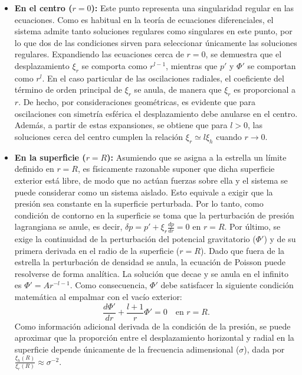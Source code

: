 \begin{itemize}
\item \textbf{En el centro ($r=0$):} Este punto representa una singularidad regular en las ecuaciones. Como es habitual en la teoría de ecuaciones diferenciales, el sistema admite tanto soluciones regulares como singulares en este punto, por lo que dos de las condiciones sirven para seleccionar únicamente las soluciones regulares. Expandiendo las ecuaciones cerca de $r=0$, se demuestra que el desplazamiento $\xi_r$ se comporta como $r^{l-1}$, mientras que $p'$ y $\Phi'$ se comportan como $r^l$. En el caso particular de las oscilaciones radiales, el coeficiente del término de orden principal de $\xi_r$ se anula, de manera que $\xi_r$ es proporcional a $r$. De hecho, por consideraciones geométricas, es evidente que para oscilaciones con simetría esférica el desplazamiento debe anularse en el centro. Además, a partir de estas expansiones, se obtiene que para $l>0$, las soluciones cerca del centro cumplen la relación $\xi_r \simeq l\xi_h$ cuando $r \rightarrow 0$.

\item \textbf{En la superficie ($r=R$):} Asumiendo que se asigna a la estrella un límite definido en $r=R$, es físicamente razonable suponer que dicha superficie exterior está libre, de modo que no actúan fuerzas sobre ella y el sistema se puede considerar como un sistema aislado. Esto equivale a exigir que la presión sea constante en la superficie perturbada. Por lo tanto, como condición de contorno en la superficie se toma que la perturbación de presión lagrangiana se anule, es decir, $\delta p = p' + \xi_r \frac{dp}{dr} = 0$ en $r=R$.
Por último, se exige la continuidad de la perturbación del potencial gravitatorio ($\Phi'$) y de su primera derivada en el radio de la superficie ($r=R$). Dado que fuera de la estrella la perturbación de densidad se anula, la ecuación de Poisson puede resolverse de forma analítica. La solución que decae y se anula en el infinito es $\Phi' = A r^{-l-1}$. Como consecuencia, $\Phi'$ debe satisfacer la siguiente condición matemática al empalmar con el vacío exterior:
\begin{equation}
\frac{d\Phi'}{dr} + \frac{l+1}{r}\Phi' = 0 \quad \text{en } r=R.
\end{equation}
Como información adicional derivada de la condición de la presión, se puede aproximar que la proporción entre el desplazamiento horizontal y radial en la superficie depende únicamente de la frecuencia adimensional ($\sigma$), dada por $\frac{\xi_h(R)}{\xi_r(R)} \approx \sigma^{-2}$.
\end{itemize}
